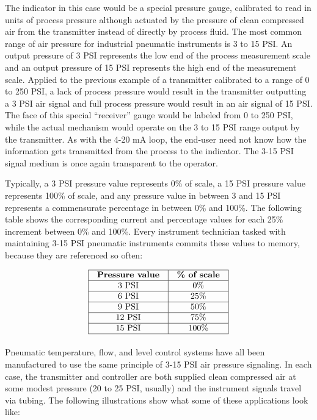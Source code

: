 The indicator in this case would be a special pressure gauge, calibrated to read in units of process pressure although actuated by the pressure of clean compressed air from the transmitter instead of directly by process fluid.  The most common range of air pressure for industrial pneumatic instruments is 3 to 15 PSI.  An output pressure of 3 PSI represents the low end of the process measurement scale and an output pressure of 15 PSI represents the high end of the measurement scale.  Applied to the previous example of a transmitter calibrated to a range of 0 to 250 PSI, a lack of process pressure would result in the transmitter outputting a 3 PSI air signal and full process pressure would result in an air signal of 15 PSI.  The face of this special ``receiver'' gauge would be labeled from 0 to 250 PSI, while the actual mechanism would operate on the 3 to 15 PSI range output by the transmitter.  As with the 4-20 mA loop, the end-user need not know how the information gets transmitted from the process to the indicator.  The 3-15 PSI signal medium is once again transparent to the operator.   

Typically, a 3 PSI pressure value represents 0\% of scale, a 15 PSI pressure value represents 100\% of scale, and any pressure value in between 3 and 15 PSI represents a commensurate percentage in between 0\% and 100\%.  The following table shows the corresponding current and percentage values for each 25\% increment between 0\% and 100\%.  Every instrument technician tasked with maintaining 3-15 PSI pneumatic instruments commits these values to memory, because they are referenced so often: 


$$\vbox{\offinterlineskip
\halign{\strut
\vrule \quad\hfil # \ \hfil & 
\vrule \quad\hfil # \ \hfil \vrule \cr
\noalign{\hrule}
%
\textbf{Pressure value} & \textbf{\% of scale} \cr
%
\noalign{\hrule}
%
3 PSI & 0\% \cr
%
\noalign{\hrule}
%
6 PSI & 25\% \cr
%
\noalign{\hrule}
%
9 PSI & 50\% \cr
%
\noalign{\hrule}
%
12 PSI & 75\% \cr
%
\noalign{\hrule}
%
15 PSI & 100\% \cr
%
\noalign{\hrule}
} %
}$$ %


\filbreak

Pneumatic temperature, flow, and level control systems have all been manufactured to use the same principle of 3-15 PSI air pressure signaling.  In each case, the transmitter and controller are both supplied clean compressed air at some modest pressure (20 to 25 PSI, usually) and the instrument signals travel via tubing.  The following illustrations show what some of these applications look like:

